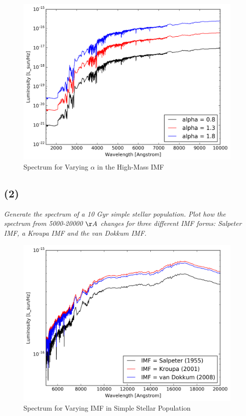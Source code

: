 \documentclass[english,11pt]{article}
\begin{document}
\begin{figure}[H]
\centering
\caption{Spectrum for Varying $\alpha$ in the High-Mass IMF}
\includegraphics[scale = 0.6]{spectra_varying_alpha_problem_5.png}
\end{figure}


\subsection*{(2)}
\textit{Generate the spectrum of a 10 Gyr simple stellar population. Plot how the spectrum from 5000-20000 $\AA$ changes for three different IMF forms: Salpeter IMF, a Kroupa IMF and the van Dokkum IMF.}\\

\begin{figure}[H]
\centering
\caption{Spectrum for Varying IMF in Simple Stellar Population}
\includegraphics[scale = 0.6]{spectra_varying_imf_problem_5.png}
\end{figure}
\end{document}
